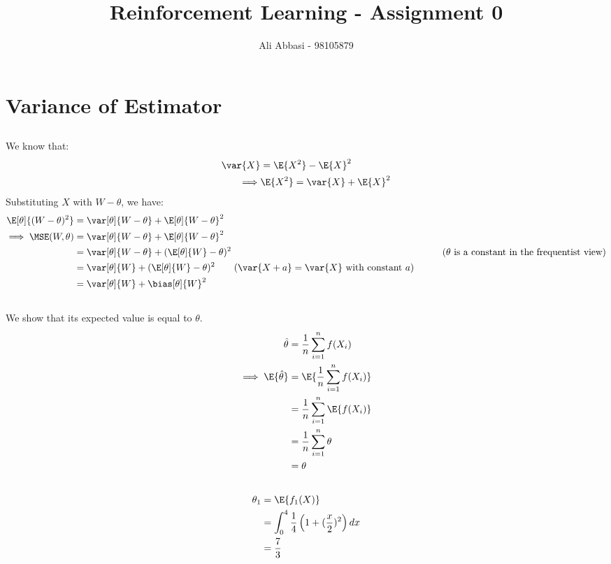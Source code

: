 \documentclass{article}
\title{Reinforcement Learning - Assignment 0}
\author{Ali Abbasi - 98105879}
\begin{document}
\maketitle
\tableofcontents
\pagebreak

\section{Variance of Estimator}
\subsection{}
We know that:
\begin{align*}
\var{X} &= \E{X^2} - \E{X}^2\\
\implies & \E{X^2} = \var{X} + \E{X}^2
\end{align*}
Substituting \(X\) with \(W - \theta\), we have:
\begin{align*}
\E[\theta]{(W - \theta)^2} &= \var[\theta]{W - \theta} + \E[\theta]{W - \theta}^2\\
\implies \MSE(W, \theta) &= \var[\theta]{W - \theta} + \E[\theta]{W - \theta}^2\\
&= \var[\theta]{W - \theta} + (\E[\theta]{W} - \theta)^2 & \tag{\(\theta\) is a constant in the frequentist view}\\
&= \var[\theta]{W} + (\E[\theta]{W} - \theta)^2 \tag{\(\var{X + a} = \var{X}\) with constant \(a\)}\\
&= \var[\theta]{W} + \bias[\theta]{W}^2
\end{align*}

\subsection{}
We show that its expected value is equal to \(\theta\).
\begin{align*}
\hat{\theta} &= \frac{1}{n} \sum_{i=1}^{n} f(X_i)\\
\implies \E{\hat{\theta}} &= \E{\frac{1}{n} \sum_{i=1}^{n} f(X_i)}\\
&= \frac{1}{n} \sum_{i=1}^{n} \E{f(X_i)}\\
&= \frac{1}{n} \sum_{i=1}^{n} \theta\\
&= \theta
\end{align*}

\subsection{}
\begin{align*}
\theta_1 &= \E{f_1(X)}\\
&= \int_{0}^{4} \frac{1}{4} \left(1 + (\frac{x}{2})^2\right) dx\\
&= \frac{7}{3}
\end{align*}
\end{document}
